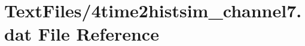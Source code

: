 \hypertarget{4time2histsim__channel7_8dat}{}\section{Text\+Files/4time2histsim\+\_\+channel7.dat File Reference}
\label{4time2histsim__channel7_8dat}

